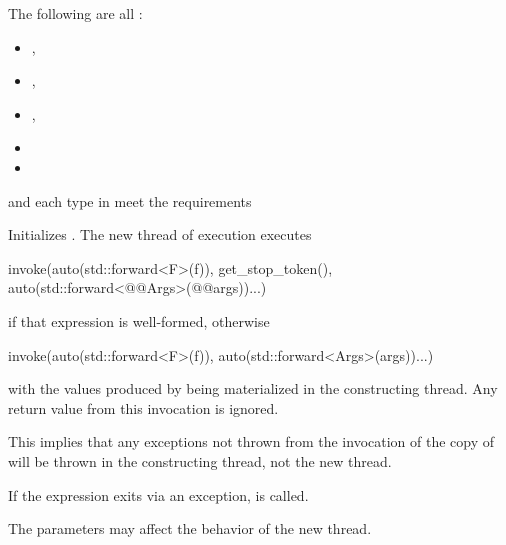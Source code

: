 \documentclass{wg21}
\begin{document}
\begin{itemdescr}
\pnum
\mandates
The following are all :
\begin{itemize}
\item {},
\item {},
\item {},
\item {}
\item {}
\end{itemize}

\pnum
\expects
{} and each type in  meet the
 requirements

\pnum
\effects
Initializes .
The new thread of execution executes
\begin{codeblock}
invoke(auto(std::forward<F>(f)), get_stop_token(),
       auto(std::forward<@@Args>(@@args))...)
\end{codeblock}
if that expression is well-formed,
otherwise
\begin{codeblock}
invoke(auto(std::forward<F>(f)), auto(std::forward<Args>(args))...)
\end{codeblock}
with the values produced by 
being materialized in the constructing thread.
Any return value from this invocation is ignored.
\begin{note}
This implies that any exceptions not thrown from the invocation of the copy
of  will be thrown in the constructing thread, not the new thread.
\end{note}
If the  expression exits via an exception,
 is called.

\begin{addedblock}
The parameters  may affect the behavior of the new thread.
\end{addedblock}


\end{itemdescr}
\end{document}
